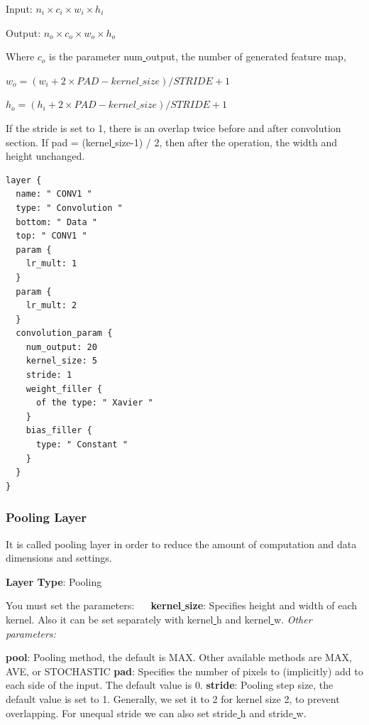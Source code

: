 \documentclass[12pt]{article}
\begin{document}
\noindent Input: $n_{i} \times c_{i} \times w_{i} \times h_{i}$

\noindent Output: $n_{o} \times c_{o} \times w_{o} \times h_{o}$

\noindent Where $c_{o}$ is the parameter num\underline{{ }{ }}output, the number of generated feature map,

\noindent $w_{o} = (w_{i} + 2 \times PAD - kernel\_size) / STRIDE + 1$

\noindent $h_{o} = (h_{i} + 2 \times PAD - kernel\_size) / STRIDE + 1$

\noindent If the stride is set to 1, there is an overlap twice before and after convolution section. If pad = (kernel\underline{{ }{ }}size-1) / 2, then after the operation, the width and height unchanged.

\begin{lstlisting}[style=json, frame=single]
layer {
  name: " CONV1 "
  type: " Convolution "
  bottom: " Data "
  top: " CONV1 "
  param {
    lr_mult: 1
  }
  param {
    lr_mult: 2
  }
  convolution_param {
    num_output: 20
    kernel_size: 5
    stride: 1
    weight_filler {
      of the type: " Xavier "
    }
    bias_filler {
      type: " Constant "
    }
  }
}
\end{lstlisting}

\subsubsection{Pooling Layer}

It is called pooling layer  in order to reduce the amount of computation and data dimensions and settings.

\noindent \textbf{Layer Type}: Pooling

\noindent You must set the parameters:
\noindent 　 \textbf{kernel\underline{{ }{ }}size}: Specifies height and width of each kernel. Also it can be set separately with kernel\underline{{ }{ }}h and kernel\underline{{ }{ }}w.
\emph{Other parameters:}

\noindent \textbf{pool}: Pooling method, the default is MAX. Other available methods are MAX, AVE, or STOCHASTIC
\noindent \textbf{pad}: Specifies the number of pixels to (implicitly) add to each side of the input. The default value is 0.
\noindent \textbf{stride}: Pooling step size, the default value is set to 1. Generally, we set it to 2 for kernel size 2, to prevent overlapping. For unequal stride we can also set stride\underline{{ }{ }}h and stride\underline{{ }{ }}w.
\end{document}

